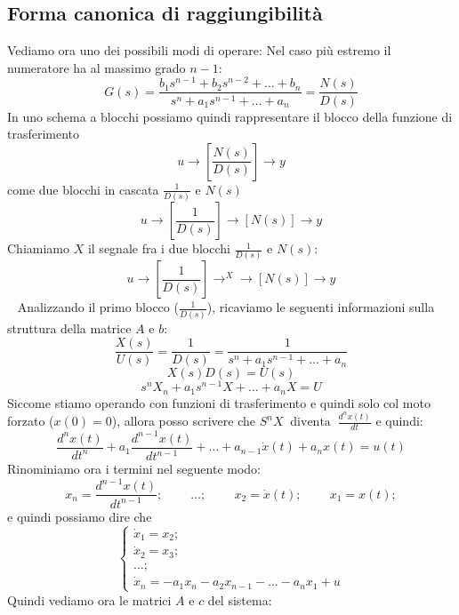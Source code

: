 \subsection{Forma canonica di raggiungibilità}
Vediamo ora uno dei possibili modi di operare:\newline
Nel caso più estremo il numeratore ha al massimo grado $n-1$:
\[
    G(s) = \frac{ b_1 s^{n-1} + b_2 s^{n-2} + \dots + b_n }{ s^n + a_1 s^{n-1} + \dots + a_n } = \frac{N(s)}{D(s)}
\]
In uno schema a blocchi possiamo quindi rappresentare il blocco della funzione di trasferimento 
\[
    u \rightarrow \left[\frac{N(s)}{D(s)}\right] \rightarrow y
\]
come due blocchi in cascata $\frac{1}{D(s)}$ e $N(s)$
\[
    u \rightarrow \left[\frac{1}{D(s)}\right] \rightarrow \left[N(s)\right] \rightarrow  y
\]
Chiamiamo $X$ il segnale fra i due blocchi $\frac{1}{D(s)}$ e $N(s)$:
\[
    u \rightarrow \left[\frac{1}{D(s)}\right] \rightarrow^X \rightarrow  \left[N(s)\right] \rightarrow  y
\]
\ \newline
Analizzando il primo blocco ($\frac{1}{D(s)}$), ricaviamo le seguenti informazioni sulla struttura della matrice $A$ e $b$:
\[
    \frac{X(s)}{U(s)} = \frac{1}{D(s)} = \frac{1}{ s^n + a_1 s^{n-1} + \dots + a_n }
\]
\[
    X(s) D(s) = U(s)
\]
\[
    s^n X_n + a_1 s^{n-1}X + \dots + a_n X = U
\]
Siccome stiamo operando con funzioni di trasferimento e quindi solo col moto forzato ($x(0) = 0$), allora posso scrivere che $S^n X \;\;\text{diventa}\;\; \frac{d^n x(t)}{dt}$ e quindi:
\[
    \frac{d^n x(t)}{dt^n} + a_1 \frac{d^{n-1} x(t)}{dt^{n-1}} + \dots + a_{n-1} \dot{x}(t) + a_n x(t) = u(t)
\]
Rinominiamo ora i termini nel seguente modo:
\[
    x_n = \frac{d^{n-1} x(t)}{dt^{n-1}}; \;\;\;\;\;\;\;\;\dots; \;\;\;\;\;\;\;\;x_2 = \dot{x}(t); \;\;\;\;\;\;\;\;x_1 = x(t);
\]
e quindi possiamo dire che 
\[
    \begin{cases}
        \dot{x}_1 = x_2;\\
        \dot{x}_2 = x_3;\\
        \dots;\\
        \dot{x}_n = -a_1 x_n - a_2 x_{n-1} - \dots - a_n x_1 + u
    \end{cases}
\]
Quindi vediamo ora le matrici $A$ e $c$ del sistema:
